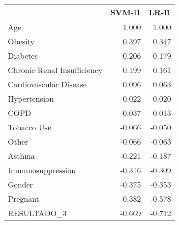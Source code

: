 \begin{tabular}{lrr}
\toprule
{} &  SVM-l1 &  LR-l1 \\
\midrule
Age                         &   1.000 &  1.000 \\
Obesity                     &   0.397 &  0.347 \\
Diabetes                    &   0.206 &  0.179 \\
Chronic Renal Insufficiency &   0.199 &  0.161 \\
Cardiovascular Disease      &   0.096 &  0.063 \\
Hypertension                &   0.022 &  0.020 \\
COPD                        &   0.037 &  0.013 \\
Tobacco Use                 &  -0.066 & -0.050 \\
Other                       &  -0.066 & -0.063 \\
Asthma                      &  -0.221 & -0.187 \\
Immunosuppression           &  -0.316 & -0.309 \\
Gender                      &  -0.375 & -0.353 \\
Pregnant                    &  -0.382 & -0.578 \\
RESULTADO\_3                 &  -0.669 & -0.712 \\
\bottomrule
\end{tabular}

